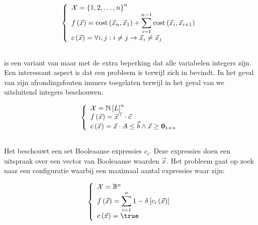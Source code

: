 \begin{equation}
\left\{\begin{array}{ll}
\mathcal{X}=\left\{ 1,2,\ldots,n\right\}^n\\
f\left(\vec{x}\right)=\mbox{cost}\left(\vec{x}_{n},\vec{x}_{1}\right)+\displaystyle\sum_{i=1}^{n-1}\mbox{cost}\left(\vec{x}_i,\vec{x}_{i+1}\right)\\
c\left(\vec{x}\right)=\forall i,j: i\neq j\rightarrow \vec{x}_i\neq\vec{x}_j
\end{array}\right.
\end{equation}

\subsection{}

 is een variant van  maar met de extra beperking dat alle variabelen integers zijn. Een interessant aspect is dat  een  probleem is terwijl  zich in  bevindt. In het geval van  zijn afrondingsfouten immers toegelaten terwijl in het geval van  we uitsluitend integers beschouwen.

\begin{equation}
\guards{
\ConfigSet=\NatSet[\bitvar]^n\\
\fun{\evalfun}{\vec{x}}=\transpose{\vec{x}}\cdot\vec{c}\\
\fun{\hcfun}{\vec{x}}=\vec{x}\cdot A\leq\vec{b}\wedge\vec{x}\geq\zeromatrix[1\times n]
}
\end{equation}

\subsection{}

Het  beschouwt een set Booleaanse expressies $c_i$. Deze expressies doen een uitspraak over een vector van Booleaanse waarden $\vec{x}$. Het probleem gaat op zoek naar een configuratie waarbij een maximaal aantal expressies waar zijn:

\begin{equation}
\guards{
\ConfigSet=\BoolSet^n\\
\fun{\evalfun}{\vec{x}}=\displaystyle\sum_{i=1}^{n}1-\krdelta{\fun{c_i}{\vec{x}}}\\
\fun{\hcfun}{\vec{x}}=\true
}
\end{equation}

